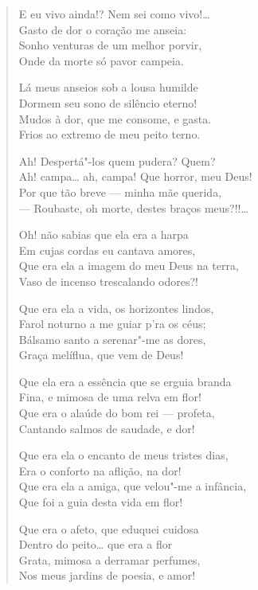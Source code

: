 \begin{verse}
E eu vivo ainda!? Nem sei como vivo!\ldots{}\\
Gasto de dor o coração me anseia:\\
Sonho venturas de um melhor porvir,\\
Onde da morte só pavor campeia.

Lá meus anseios sob a lousa humilde\\
Dormem seu sono de silêncio eterno!\\
Mudos à dor, que me consome, e gasta.\\
Frios ao extremo de meu peito terno.

Ah! Despertá"-los quem pudera? Quem?\\
Ah! campa\ldots{} ah, campa! Que horror, \qb{}meu Deus!\\
Por que tão breve --- minha mãe querida,\\
--- Roubaste, oh morte, destes braços meus?!!\ldots{}

Oh! não sabias que ela era a harpa\\
Em cujas cordas eu cantava amores,\\
Que era ela a imagem do meu Deus na terra,\\
Vaso de incenso trescalando odores?!

Que era ela a vida, os horizontes lindos,\\
Farol noturno a me guiar p'ra os céus;\\
Bálsamo santo a serenar"-me as dores,\\
Graça melíflua, que vem de Deus!

Que ela era a essência que se erguia branda\\
Fina, e mimosa de uma relva em flor!\\
Que era o alaúde do bom rei --- profeta,\\
Cantando salmos de saudade, e dor!

Que era ela o encanto de meus tristes dias,\\
Era o conforto na aflição, na dor!\\
Que era ela a amiga, que velou"-me a infância,\\
Que foi a guia desta vida em flor!

Que era o afeto, que eduquei cuidosa\\
Dentro do peito\ldots{} que era a flor\\
Grata, mimosa a derramar perfumes,\\
Nos meus jardins de poesia, e amor!


\end{verse}
